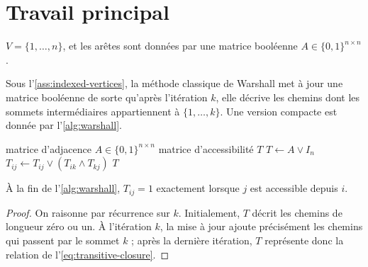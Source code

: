 \chapter{Travail principal}
\label{ch:main-work}


\begin{assumption}
\label{ass:indexed-vertices}
$V=\{1,\dots,n\}$, et les arêtes sont données par une matrice booléenne
$A\in\{0,1\}^{n\times n}$.
\end{assumption}

Sous l'\cref{ass:indexed-vertices}, la méthode classique de Warshall \cite{warshall1962}
met à jour une matrice booléenne de sorte qu'après l'itération $k$, elle décrive
les chemins dont les sommets intermédiaires appartiennent à
$\{1,\dots,k\}$. Une version compacte est donnée par
l'\cref{alg:warshall}.

\begin{algorithm}[htbp]
\caption{Clôture réflexive transitive d'une matrice d'adjacence}
\label{alg:warshall}
\begin{algorithmic}[1]
  \Require matrice d'adjacence $A\in\{0,1\}^{n\times n}$
  \Ensure matrice d'accessibilité $T$
  \State $T\gets A\lor I_n$
        \State $T_{ij}\gets T_{ij}\lor(T_{ik}\land T_{kj})$
      \EndFor
    \EndFor
  \EndFor
  \State \Return $T$
\end{algorithmic}
\end{algorithm}

\begin{proposition}
\label{prop:warshall-correct}
À la fin de l'\cref{alg:warshall}, $T_{ij}=1$ exactement lorsque $j$ est
accessible depuis $i$.
\end{proposition}

\begin{proof}
On raisonne par récurrence sur $k$. Initialement, $T$ décrit les chemins de
longueur zéro ou un. À l'itération $k$, la mise à jour ajoute précisément les
chemins qui passent par le sommet $k$ ; après la dernière itération, $T$
représente donc la relation de l'\cref{eq:transitive-closure}.
\end{proof}
